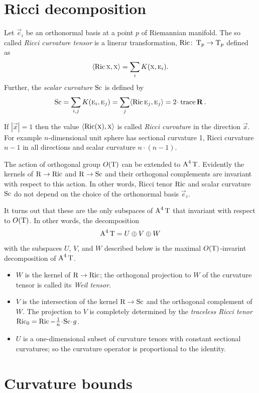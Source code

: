 \section{Ricci decomposition}

Let ${\vec e_i}$ be an orthonormal basis at a point $p$ of Riemannian manifold.
The so called \emph{Ricci curvature tensor} is a linerar transformation, $\operatorname{\rm Ric}\nolimits\colon\operatorname{\rm T}_p\to\operatorname{\rm T}_p$ defined as
\[\langle\operatorname{\rm Ric}\nolimits\textsc x,\textsc x\rangle=\sum_i K(\textsc x,\textsc e_i).\]
Further, the \emph{scalar curvature} $\mathrm{Sc}$ is defined by 
\[\Sc=\sum_{i,j} K(\vec e_i,\vec e_j)=\sum_{j}\langle\Ric \vec e_j,\vec e_j\rangle=2\cdot\trace \Rop.\]

If $|\vec x|=1$ then the value $\langle\operatorname{\rm Ric}\nolimits(\textsc x),\textsc x\rangle$ is called \emph{Ricci curvature} in the direction $\vec x$.
For example $n$-dimensional unit sphere has sectional curvature 1, Ricci curvature $n-1$ in all directions and scalar curvature $n\cdot(n-1)$.

The action of orthogonal group $O(\operatorname{\rm T})$ can be extended to $\operatorname{\rm A}^4\operatorname{\rm T}$.
Evidently the kernels of $\operatorname{\rm R}\nolimits\to \operatorname{\rm Ric}\nolimits$ and $\operatorname{\rm R}\nolimits\to\mathrm{Sc}$ and their orthogonal complements are invariant with respect to this action.
In other words, Ricci tenor $\operatorname{\rm Ric}\nolimits$ and scalar curvature $\mathrm{Sc}$ do not depend on the choice of the orthonormal basis ${\vec e_i}$.

It turns out that these are the only subspaces of $\operatorname{\rm A}^4\operatorname{\rm T}$ that invariant with respect to $O(\operatorname{\rm T})$.
In other words, the decomposition 
\[\operatorname{\rm A}^4\operatorname{\rm T}=U\oplus V \oplus W\]
with the subspaces $U$, $V$, and $W$ described below is the maximal $O(\operatorname{\rm T})$-invarint decomposition of $\operatorname{\rm A}^4\operatorname{\rm T}$.
\begin{itemize}
\item $W$ is the kernel of $\operatorname{\rm R}\nolimits\to \operatorname{\rm Ric}\nolimits$; the orthogonal projection to $W$ of the curvature tensor is called its \emph{Weil tensor}.
\item $V$ is the intersection of the kernel $\operatorname{\rm R}\nolimits\to\mathrm{Sc}$ and the orthogonal complement of $W$. The projection to $V$ is completely determined by the \emph{traceless Ricci tenor} $\Ric_0=\Ric-\tfrac1n\cdot \Sc\cdot g$.
\item $U$ is a one-dimensional subset of curvature tenors with constant sectional curvatures; so the curvature operator is proportional to the identity.
\end{itemize}

 



\section{Curvature bounds}


